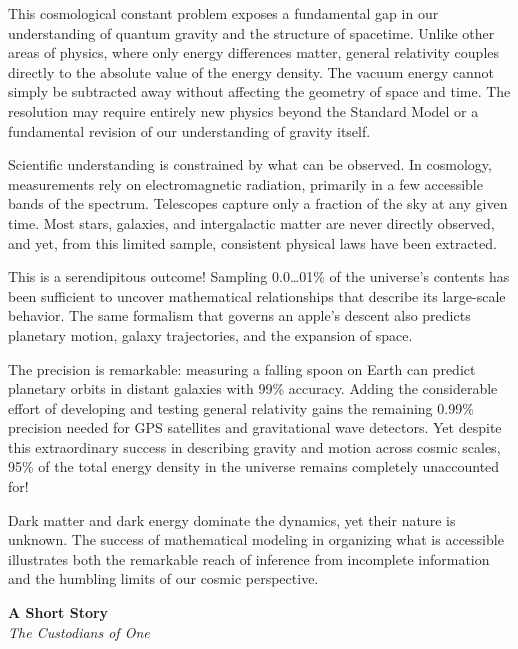 This cosmological constant problem exposes a fundamental gap in our understanding of quantum gravity and the structure of spacetime. Unlike other areas of physics, where only energy differences matter, general relativity couples directly to the absolute value of the energy density. The vacuum energy cannot simply be subtracted away without affecting the geometry of space and time. The resolution may require entirely new physics beyond the Standard Model or a fundamental revision of our understanding of gravity itself.

\begin{commentary}
Scientific understanding is constrained by what can be observed. In cosmology, measurements rely on electromagnetic radiation, primarily in a few accessible bands of the spectrum. Telescopes capture only a fraction of the sky at any given time. Most stars, galaxies, and intergalactic matter are never directly observed, and yet, from this limited sample, consistent physical laws have been extracted.

This is a serendipitous outcome! Sampling 0.0\ldots01\% of the universe's contents has been sufficient to uncover mathematical relationships that describe its large-scale behavior. The same formalism that governs an apple's descent also predicts planetary motion, galaxy trajectories, and the expansion of space.

The precision is remarkable: measuring a falling spoon on Earth can predict planetary orbits in distant galaxies with 99\% accuracy. Adding the considerable effort of developing and testing general relativity gains the remaining 0.99\% precision needed for GPS satellites and gravitational wave detectors. Yet despite this extraordinary success in describing gravity and motion across cosmic scales, 95\% of the total energy density in the universe remains completely unaccounted for!

Dark matter and dark energy dominate the dynamics, yet their nature is unknown. The success of mathematical modeling in organizing what is accessible illustrates both the remarkable reach of inference from incomplete information and the humbling limits of our cosmic perspective.

\end{commentary}

\newpage
\thispagestyle{empty}

\begin{center}
\vspace*{1cm}
{\Large\textbf{A Short Story}}\\[0.5cm]
{\large\textit{The Custodians of One}}
\vspace{0.5cm}
\end{center}

